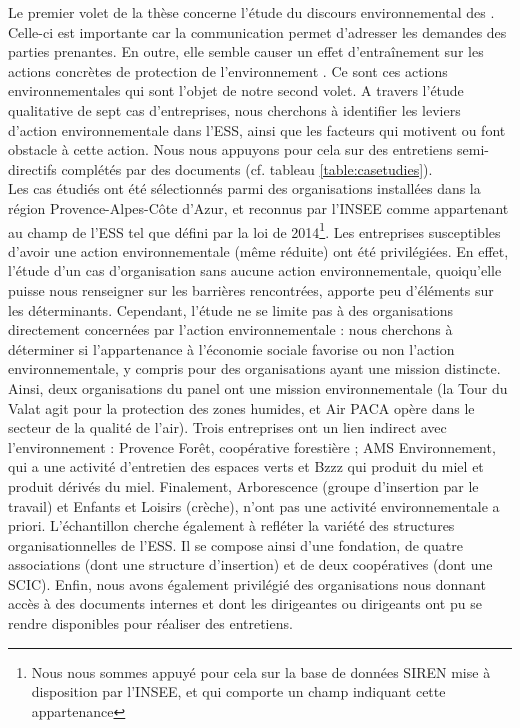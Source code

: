 Le premier volet de la thèse concerne l'étude du discours environnemental des \eess. Celle-ci est importante car la communication permet d'adresser les demandes des parties prenantes. En outre, elle semble causer un effet d'entraînement sur les actions concrètes de protection de l'environnement \parencite{frandsen2011rhetoric}. Ce sont ces actions environnementales qui sont l'objet de notre second volet. A travers l'étude qualitative de sept cas d'entreprises, nous cherchons à identifier les leviers d'action environnementale dans l'ESS, ainsi que les facteurs qui motivent ou font obstacle à cette action. Nous nous appuyons pour cela sur des entretiens semi-directifs complétés par des documents (cf. tableau \ref{table:casetudies}). \\

Les cas étudiés ont été sélectionnés parmi des organisations installées dans la région Provence-Alpes-Côte d'Azur, et reconnus par l'INSEE comme appartenant au champ de l'ESS tel que défini par la loi de 2014\footnote{Nous nous sommes appuyé pour cela sur la base de données SIREN mise à disposition par l'INSEE, et qui comporte un champ indiquant cette appartenance}. Les entreprises susceptibles d'avoir une action environnementale (même réduite) ont été privilégiées. En effet, l'étude d'un cas d'organisation sans aucune action environnementale, quoiqu'elle puisse nous renseigner sur les barrières rencontrées, apporte peu d'éléments sur les déterminants. Cependant, l'étude ne se limite pas à des organisations directement concernées par l'action environnementale : nous cherchons à déterminer si l'appartenance à l'économie sociale favorise ou non l'action environnementale, y compris pour des organisations ayant une mission distincte. Ainsi, deux organisations du panel ont une mission environnementale (la Tour du Valat agit pour la protection des zones humides, et Air PACA opère dans le secteur de la qualité de l'air). Trois entreprises ont un lien indirect avec l'environnement : Provence Forêt, coopérative forestière ; AMS Environnement, qui a une activité d'entretien des espaces verts et Bzzz qui produit du miel et produit dérivés du miel. Finalement, Arborescence (groupe d'insertion par le travail) et Enfants et Loisirs (crèche), n'ont pas une activité environnementale a priori. L'échantillon cherche également à refléter la variété des structures organisationnelles de l'ESS. Il se compose ainsi d'une fondation, de quatre associations (dont une structure d'insertion) et de deux coopératives (dont une SCIC). Enfin, nous avons également privilégié des organisations nous donnant accès à des documents internes et dont les dirigeantes ou dirigeants ont pu se rendre disponibles pour réaliser des entretiens. 


